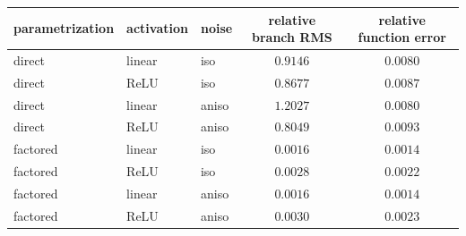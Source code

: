 \begin{tabular}{lllcc}
\toprule
parametrization & activation & noise & relative branch RMS & relative function error \\
\midrule
direct & linear & iso & $0.9146$ & $0.0080$ \\
direct & ReLU & iso & $0.8677$ & $0.0087$ \\
direct & linear & aniso & $1.2027$ & $0.0080$ \\
direct & ReLU & aniso & $0.8049$ & $0.0093$ \\
\midrule
factored & linear & iso & $0.0016$ & $0.0014$ \\
factored & ReLU & iso & $0.0028$ & $0.0022$ \\
factored & linear & aniso & $0.0016$ & $0.0014$ \\
factored & ReLU & aniso & $0.0030$ & $0.0023$ \\
\bottomrule
\end{tabular}
